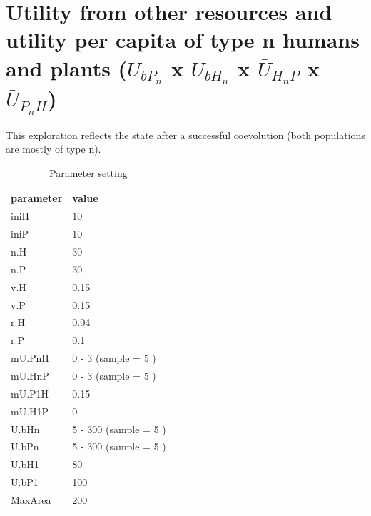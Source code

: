 \documentclass[
]{book}
\begin{document}
\newpage

\hypertarget{utility-from-other-resources-and-utility-per-capita-of-type-n-humans-and-plants-u_bp_n-x-u_bh_n-x-baru_h_np-x-baru_p_nh}{%
\section{\texorpdfstring{Utility from other resources and utility per capita of type n humans and plants (\(U_{bP_{n}}\) x \(U_{bH_{n}}\) x \(\bar{U}_{H_{n}P}\) x \(\bar{U}_{P_{n}H}\))}{Utility from other resources and utility per capita of type n humans and plants (U\_\{bP\_\{n\}\} x U\_\{bH\_\{n\}\} x \textbackslash bar\{U\}\_\{H\_\{n\}P\} x \textbackslash bar\{U\}\_\{P\_\{n\}H\})}}\label{utility-from-other-resources-and-utility-per-capita-of-type-n-humans-and-plants-u_bp_n-x-u_bh_n-x-baru_h_np-x-baru_p_nh}}


This exploration reflects the state after a successful coevolution (both populations are mostly of type n).

\begin{table}[!h]

\caption{\label{tab:4UbnmUntablepdf}Parameter setting}
\centering
\begin{tabular}[t]{l|l}
\hline
parameter & value\\
\hline
iniH & 10\\
\hline
iniP & 10\\
\hline
n.H & 30\\
\hline
n.P & 30\\
\hline
v.H & 0.15\\
\hline
v.P & 0.15\\
\hline
r.H & 0.04\\
\hline
r.P & 0.1\\
\hline
mU.PnH & 0 - 3 (sample = 5 )\\
\hline
mU.HnP & 0 - 3 (sample = 5 )\\
\hline
mU.P1H & 0.15\\
\hline
mU.H1P & 0\\
\hline
U.bHn & 5 - 300 (sample = 5 )\\
\hline
U.bPn & 5 - 300 (sample = 5 )\\
\hline
U.bH1 & 80\\
\hline
U.bP1 & 100\\
\hline
MaxArea & 200\\
\hline
\end{tabular}
\end{table}
\end{document}
